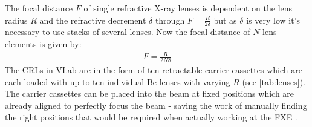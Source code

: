 \documentclass[10pt,a4paper, bibliography=totoc]{scrartcl}
\begin{document}
The focal distance $F$ of single refractive X-ray lenses is dependent on the lens radius $R$ and the refractive decrement $\delta$ through $F=\frac{R}{2\delta}$ but as $\delta$ is very low it's necessary to use stacks of several lenses. Now the focal distance of $N$ lens elements is given by:
\begin{align}
	F=\frac{R}{2N\delta}
\end{align} 
The CRLs in VLab are in the form of ten retractable carrier cassettes which are each loaded with up to ten individual Be lenses with varying $R$ (see \autoref{tab:lenses}). The carrier cassettes can be placed into the beam at fixed positions which are already aligned to perfectly focus the beam - saving the work of manually finding the right positions that would be required when actually working at the FXE \cite{0}.

\end{document}
